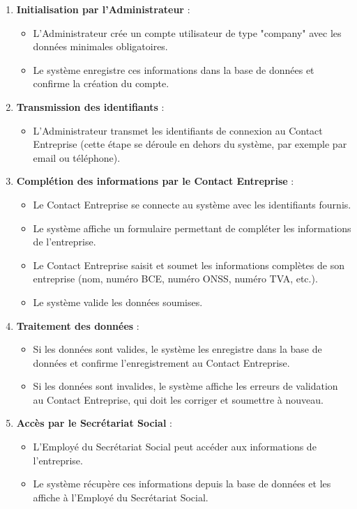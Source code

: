 \begin{enumerate}
  \item \textbf{Initialisation par l'Administrateur} :
    \begin{itemize}
      \item L'Administrateur crée un compte utilisateur de type "company" avec les données minimales obligatoires.
      \item Le système enregistre ces informations dans la base de données et confirme la création du compte.
    \end{itemize}

  \item \textbf{Transmission des identifiants} :
    \begin{itemize}
      \item L'Administrateur transmet les identifiants de connexion au Contact Entreprise (cette étape se déroule en dehors du système, par exemple par email ou téléphone).
    \end{itemize}

  \item \textbf{Complétion des informations par le Contact Entreprise} :
    \begin{itemize}
      \item Le Contact Entreprise se connecte au système avec les identifiants fournis.
      \item Le système affiche un formulaire permettant de compléter les informations de l'entreprise.
      \item Le Contact Entreprise saisit et soumet les informations complètes de son entreprise (nom, numéro BCE, numéro ONSS, numéro TVA, etc.).
      \item Le système valide les données soumises.
    \end{itemize}

  \item \textbf{Traitement des données} :
    \begin{itemize}
      \item Si les données sont valides, le système les enregistre dans la base de données et confirme l'enregistrement au Contact Entreprise.
      \item Si les données sont invalides, le système affiche les erreurs de validation au Contact Entreprise, qui doit les corriger et soumettre à nouveau.
    \end{itemize}

  \item \textbf{Accès par le Secrétariat Social} :
    \begin{itemize}
      \item L'Employé du Secrétariat Social peut accéder aux informations de l'entreprise.
      \item Le système récupère ces informations depuis la base de données et les affiche à l'Employé du Secrétariat Social.
    \end{itemize}
\end{enumerate}

